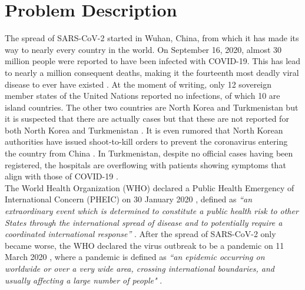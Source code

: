 \documentclass[12pt]{article}
\begin{document}
	\section{Problem Description} \label{sec:problem_description}
	The spread of SARS-CoV-2 started in Wuhan, China, from which it has made its way to nearly every country in the world. On September 16, 2020, almost 30 million people were reported to have been infected with COVID-19. This has lead to nearly a million consequent deaths, making it the fourteenth most deadly viral disease to ever have existed \parencite{lepan2020historyPandemics}. At the moment of writing, only 12 sovereign member states of the United Nations reported no infections, of which 10 are island countries. The other two countries are North Korea and Turkmenistan but it is suspected that there are actually cases but that these are not reported for both North Korea \parencite{nebehay2020dprk} and Turkmenistan \parencite{hrw2020turkmenistan}. It is even rumored that North Korean authorities have issued shoot-to-kill orders to prevent the coronavirus entering the country from China \parencite{bangkok2020deathrate}. In Turkmenistan, despite no official cases having been registered, the hospitals are overflowing with patients showing symptoms that align with those of COVID-19 \parencite{RFERL2020Turkmenistan}. \\
	
	The World Health Organization (WHO) declared a Public Health Emergency of International Concern (PHEIC) on 30 January 2020 \parencite{who2020pheic}, defined as \textit{``an extraordinary event which is determined to constitute a public health risk to other States through the international spread of disease and to potentially require a coordinated international response”} \parencite{who2019ihr}. After the spread of SARS-CoV-2 only became worse, the WHO declared the virus outbreak to be a pandemic on 11 March 2020 \parencite{who2020pandemic}, where a pandemic is defined as \textit{``an epidemic occurring on worldwide or over a very wide area, crossing international boundaries, and usually affecting a large number of people"} \parencite{porta2014dictionary}. \\
	
\end{document}
